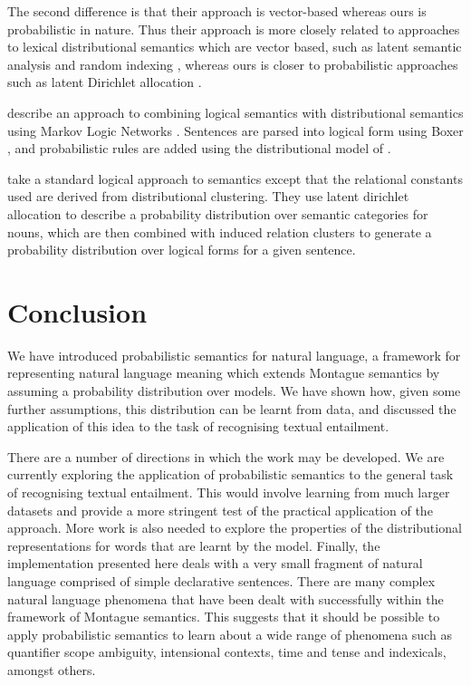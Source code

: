 \documentclass[letterpaper]{article}
\newcommand{\citet}[1]{\newcite{#1}}
\begin{document}
The second difference is that their approach is vector-based whereas
ours is probabilistic in nature. Thus their approach is more
closely related to approaches to lexical distributional semantics
which are vector based, such as latent semantic analysis
\cite{Deerwester:90} and random indexing \cite{Sahlgren:02}, whereas
ours is closer to probabilistic approaches such as latent Dirichlet
allocation \cite{Blei:03}.

\citet{Garrette:11} describe an approach to combining logical
semantics with distributional semantics using Markov Logic Networks
\cite{Richardson:06}. Sentences are parsed into logical form using
Boxer \cite{Bos:04}, and probabilistic rules are added using the
distributional model of \citet{Erk:10}.

\citet{Lewis:13} take a standard logical approach to semantics except
that the relational constants used are derived from distributional
clustering. They use latent dirichlet allocation to describe a
probability distribution over semantic categories for nouns, which are
then combined with induced relation clusters to generate a probability
distribution over logical forms for a given sentence.

\section{Conclusion}

We have introduced probabilistic semantics for natural language, a
framework for representing natural language meaning which extends
Montague semantics by assuming a probability distribution over
models. We have shown how, given some further assumptions, this
distribution can be learnt from data, and discussed the application of
this idea to the task of recognising textual entailment. 

There are a number of directions in which the work may be developed. We are currently  exploring the application of probabilistic semantics to the general task of recognising textual entailment. This would involve learning from much larger datasets and provide a more stringent test of the practical application of the approach. More work is also needed to explore the properties of the distributional representations for words that are learnt by the model. Finally, the implementation presented here deals with a very small fragment of natural language comprised of simple declarative sentences. There are many complex natural language phenomena that have been dealt with successfully within the framework of Montague semantics. This suggests that it should be possible to apply probabilistic semantics to learn about a wide range of phenomena such as quantifier scope ambiguity, intensional contexts, time and tense and indexicals, amongst others. 




\end{document}
